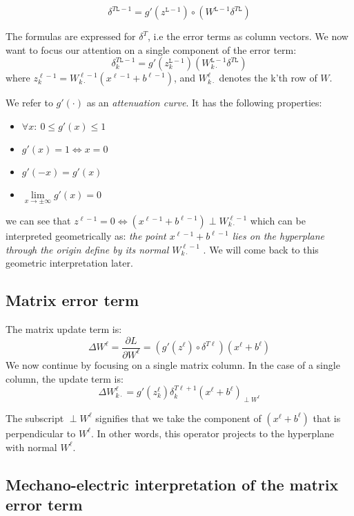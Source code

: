 \documentclass[]{article}
\begin{document}
 		$$ \delta^{T\mathtt{L}-1} = g'(z^{\mathtt{L}-1}) \circ (W^{\mathtt{L}-1}\delta^{T\mathtt{L}})$$
 		
 		The formulas are expressed for $\delta^T$, i.e the error terms as column vectors.
 		We now want to focus our attention on a single component of the error term:
 		 	$$ \delta^{T\mathtt{L}-1}_k = g'(z^{\mathtt{L}-1}_k) (W^{\mathtt{L}-1}_{k\cdot}\delta^{T\mathtt{L}})$$
 		where $z_k^{\ell-1} = W^{\ell-1}_{k\cdot}(x^{\ell-1}+b^{\ell-1})$, and $W^{\ell}_{k\cdot}$ denotes the k'th row of $W$.
 		 
 		 
 		
		We refer to $g'(\cdot)$ as an \textit{attenuation curve}. It has the following properties: 
		\begin{itemize}
			\item $\forall x:\ 0 \le g'(x) \le 1$
			\item $g'(x)=1 \Leftrightarrow x=0$
			\item $g'(-x) = g'(x)$
			\item $\lim\limits_{x \to \pm \infty}g'(x) = 0$
		\end{itemize} 
 		 we can see that 
 		 $z^{\ell-1} =0 \Leftrightarrow (x^{\ell-1}+b^{\ell-1}) \perp W^{\ell-1}_{k\cdot}$ 
 		 which can be interpreted geometrically as: \textit{the point $x^{\ell-1}+b^{\ell-1}$ lies on the  hyperplane through the origin define by its normal $W^{\ell-1}_{k\cdot}$ }. We will come back to this geometric interpretation later.
 		 
  	\subsection{Matrix error term}
		The matrix update term is:
  			$$ \Delta W^\ell = \frac{\partial L}{\partial W^\ell} = (g'(z^{\ell}) \circ  \delta^{T\ell}) (x^{\ell}+b^{\ell})$$
 		We now continue by focusing on a single matrix column. In the case of a single column, the update term is:
	  		$$ \Delta W^\ell_{k\cdot}  = g'(z^{\ell}_k)  \delta^{T\ell+1}_k (x^{\ell}+b^{\ell})_{\perp W^\ell}$$
		

	  	The subscript $\perp W^\ell$ signifies that we take the component of $(x^{\ell}+b^{\ell})$ that is perpendicular to $W^\ell$. In other words, this operator projects to the hyperplane with normal $W^\ell$.
	  	
	  \subsection{Mechano-electric interpretation of the matrix error term}
	  	
\end{document}
